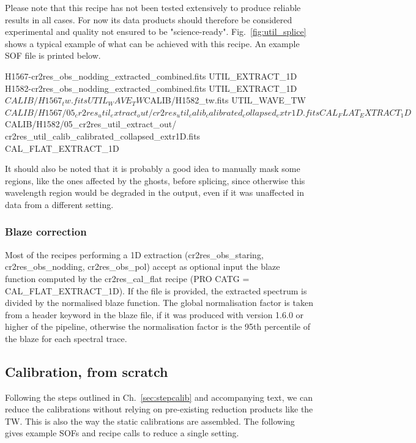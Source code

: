 Please note that this recipe has not been tested extensively to produce reliable
results in all cases. For now its data products should therefore be considered
experimental and quality not ensured to be "science-ready". Fig.~\ref{fig:util_splice}
shows a typical example of what can be achieved with this recipe. An example SOF
file is printed below.

\begin{shell}[fontsize=\small]
H1567-cr2res_obs_nodding_extracted_combined.fits UTIL_EXTRACT_1D
H1582-cr2res_obs_nodding_extracted_combined.fits UTIL_EXTRACT_1D
$CALIB/H1567_tw.fits UTIL_WAVE_TW
$CALIB/H1582_tw.fits UTIL_WAVE_TW
$CALIB/H1567/05_cr2res_util_extract_out/
  cr2res_util_calib_calibrated_collapsed_extr1D.fits CAL_FLAT_EXTRACT_1D
$CALIB/H1582/05_cr2res_util_extract_out/
  cr2res_util_calib_calibrated_collapsed_extr1D.fits CAL_FLAT_EXTRACT_1D
\end{shell}

It should also be noted that it is probably a good idea to manually mask some
regions, like the ones affected by the ghosts, before splicing, since otherwise
this wavelength region would be degraded in the output, even if it was
unaffected in data from a different setting. 

\subsubsection{Blaze correction}

Most of the recipes performing a 1D extraction (cr2res\_obs\_staring,
cr2res\_obs\_nodding, cr2res\_obs\_pol) accept as optional input the 
blaze function computed by the cr2res\_cal\_flat recipe
(PRO CATG = CAL\_FLAT\_EXTRACT\_1D).
If the file is provided, the extracted spectrum is divided by the
normalised blaze function. The global normalisation factor is taken 
from a header keyword in the blaze file, if it was produced with version 1.6.0 or
higher of the pipeline, otherwise the normalisation factor is the 95th
percentile of the blaze for each spectral trace.

\subsection{Calibration, from scratch}
\label{sec:calibscratch}
Following the steps outlined in Ch.~\ref{sec:stepcalib} and accompanying text,
we can reduce the calibrations without relying on pre-existing reduction
products like the TW. This is also the way the static calibrations are
assembled. The following gives example SOFs and recipe calls to reduce a single
setting.

